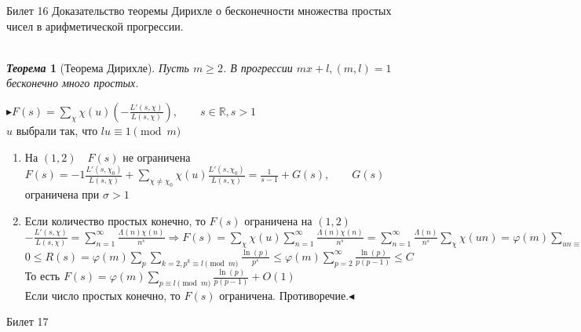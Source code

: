 \documentclass[a4paper,12pt]{article}
\newtheorem{teo}{\textit{Теорема}}
\newcommand{\ee}{\equiv}
\newcommand{\FI}{\varphi}
\newcommand{\q}{\quad}
\newcommand{\pb}{\blacktriangleright}
\newcommand{\pe}{\blacktriangleleft}
\newcommand{\Ra}{\Rightarrow}
\newcommand{\bb}[1]{\mathbb{#1}}
\newcommand{\SL}{\sum\limits}
\newcommand{\os}{\left(}
\newcommand{\cs}{\right)}
\begin{document}
\newpage
\begin{mybox}{\hypertarget{bil16}{Билет 16}}
Доказательство теоремы Дирихле о бесконечности множества простых чисел в арифметической прогрессии.\\\q\\
\begin{teo}[Теорема Дирихле] Пусть $m\ge 2$. В прогрессии $mx+l, (m,l) = 1$ бесконечно много простых.
\end{teo}
$\pb F(s) = \SL_{\chi}\chi(u) \os -\frac{L'(s,\chi)}{L(s,\chi)}  \cs, \q\q s\in\bb{R}, s > 1 $\\
$u$ выбрали так, что $lu\ee 1\pmod{m}$\\
\begin{enumerate}
\item На $(1,2)\q F(s)$ не ограничена\\
$F(s) = -1 \frac{L'(s,\chi_0)}{L(s,\chi)} + \SL_{\chi\not=\chi_0} \chi(u) \frac{L'(s,\chi_0)}{L(s,\chi)}  = \frac{1}{s-1} + G(s),\q\q G(s) $ ограничена при $\sigma > 1$
\item Если количество простых конечно, то $F(s)$ ограничена на $(1,2)$\\
$-\frac{L'(s,\chi)}{L(s,\chi)} = \SL_{n=1}^\infty \frac{\Lambda(n)\chi(n)}{n^s}\Ra F(s) = \SL_{\chi} \chi(u) \SL_{n=1}^\infty \frac{\Lambda(n)\chi(n)}{n^s} = \SL_{n=1}^\infty \frac{\Lambda(n)}{n^s} \SL_\chi \chi(un) = \FI(m) \SL_{un\ee1\pmod{m}} \frac{\Lambda(n)}{n^s}  =  \FI(m) \SL_{n\ee l\pmod{m}} \frac{\Lambda(n)}{n^s} = \FI(m)\SL_{p\ee l\pmod{m}} \frac{\ln(p)}{p^s} + R(s)$\\
$0 \le R(s)  = \FI(m)\SL_{p}\SL_{k=2, p^k \ee l\pmod{m}}  \frac{\ln(p)}{p^s}\le \FI(m)  \SL_{p=2}^\infty \frac{\ln(p)}{p(p-1)} \le C $\\
То есть $F(s) = \FI(m) \SL_{p\ee l\pmod{m}} \frac{\ln(p)}{p(p-1)} + O(1) $\\
Если число простых конечно, то $F(s) $ ограничена. Противоречие.$\pe$
\end{enumerate}

\end{mybox}



\newpage
\begin{mybox}{\hypertarget{bil17}{Билет 17}}


\end{mybox}
\end{document}
